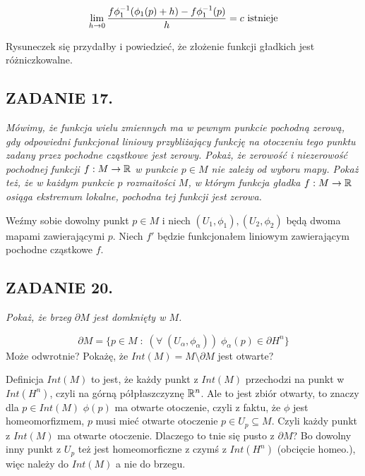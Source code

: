 \documentclass{article}
\begin{document}
$$\lim\limits_{h\to0}{f\phi_1^{-1}(\phi_1(p)+h)-f\phi_1^{-1}(p)\over h}=c\text{ istnieje}$$

Rysuneczek się przydałby i powiedzieć, że złożenie funkcji gładkich jest różniczkowalne.

\subsection*{ZADANIE 17.}
\emph{\color{pink}Mówimy, że funkcja wielu zmiennych ma w pewnym punkcie pochodną zerową, gdy odpowiedni funkcjonał liniowy przybliżający funkcję na otoczeniu tego punktu zadany przez pochodne cząstkowe jest zerowy. Pokaż, że zerowość i niezerowość pochodnej funkcji $f:M\to\mathbb{R}$ w punkcie $p\in M$ nie zależy od wyboru mapy. Pokaż też, że w każdym punkcie $p$ rozmaitości $M$, w którym funkcja gładka $f:M\to\mathbb{R}$ osiąga ekstremum lokalne, pochodna tej funkcji jest zerowa.}
\smallskip

Weźmy sobie dowolny punkt $p\in M$ i niech $(U_1,\phi_1),(U_2,\phi_2)$ będą dwoma mapami zawierającymi $p$. Niech $f'$ będzie funkcjonałem liniowym zawierającym pochodne cząstkowe $f$. 

\subsection*{ZADANIE 20.}
\emph{\color{pink}Pokaż, że brzeg $\partial M$ jest domknięty w $M$.}
\smallskip

$$\partial M=\{p\in M\;:\;(\forall\;(U_\alpha, \phi_\alpha))\;\phi_\alpha(p)\in\partial H^n\}$$
Może odwrotnie? Pokażę, że $Int(M)=M\setminus\partial M$ jest otwarte?

Definicja $Int(M)$ to jest, że każdy punkt z $Int(M)$ przechodzi na punkt w $Int(H^n)$, czyli na górną półpłaszczyznę $\mathbb{R}^n$. Ale to jest zbiór otwarty, to znaczy dla $p\in Int(M)$ $\phi(p)$ ma otwarte otoczenie, czyli z faktu, że $\phi$ jest homeomorfizmem, $p$ musi mieć otwarte otoczenie $p\in U_p\subseteq M$. Czyli każdy punkt z $Int(M)$ ma otwarte otoczenie. Dlaczego to tnie się pusto z $\partial M$? Bo dowolny inny punkt z $U_p$ też jest homeomorficzne z czymś z $Int(H^n)$ (obcięcie homeo.), więc należy do $Int(M)$ a nie do brzegu.
\end{document}
